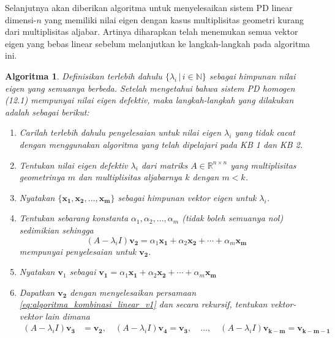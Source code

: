 \documentclass[a4paper]{article}
\theoremstyle{definisi}
\newtheorem{algoritma}{Algoritma}[section]
\numberwithin{equation}{section}
\newcommand{\R}{\mathbb{R}}
\newcommand{\N}{\mathbb{N}}
\begin{document}
  Selanjutnya akan diberikan algoritma untuk menyelesaikan sistem PD linear dimensi-$n$ yang memiliki nilai eigen dengan kasus multiplisitas geometri kurang dari multiplisitas aljabar. Artinya diharapkan telah menemukan semua vektor eigen yang bebas linear sebelum melanjutkan ke langkah-langkah pada algoritma ini.
  \begin{algoritma}\label{algoritma}
    Definisikan terlebih dahulu $\{\lambda_i\,|\,i\in\N\}$ sebagai himpunan nilai eigen yang semuanya berbeda. Setelah mengetahui bahwa sistem PD homogen (12.1) mempunyai nilai eigen \textit{defektiv}, maka langkah-langkah yang dilakukan adalah sebagai berikut:
  \begin{enumerate}[label=Langkah \arabic*: ,leftmargin=*]
    \item Carilah terlebih dahulu penyelesaian untuk nilai eigen $\lambda_i$ yang tidak cacat dengan menggunakan algoritma yang telah dipelajari pada KB 1 dan KB 2.
    \item Tentukan nilai eigen \textit{defektiv} $\lambda_i$ dari matriks $A\in\R^{n\times n}$ yang multiplisitas geometrinya $m$ dan multiplisitas aljabarnya $k$ dengan $m<k$.
    \item Nyatakan $\{\mathbf{x_1},\mathbf{x_2},\ldots,\mathbf{x_m}\}$ sebagai himpunan vektor eigen untuk $\lambda_i$.
    \item Tentukan sebarang konstanta $\alpha_1,\alpha_2,\ldots,\alpha_m$ (tidak boleh semuanya nol) sedimikian sehingga
    \begin{equation}\label{eq:algoritma_kombinasi_linear_v1}
      (A-\lambda_iI)\mathbf{v_2}=\alpha_1\mathbf{x_1}+\alpha_2\mathbf{x_2}+\cdots+\alpha_m\mathbf{x_m}
    \end{equation}
    mempunyai penyelesaian untuk $\mathbf{v_2}$.
    \item Nyatakan $\mathbf{v}_1$ sebagai $\mathbf{v_1}=\alpha_1\mathbf{x_1}+\alpha_2\mathbf{x_2}+\cdots+\alpha_m\mathbf{x_m}$ 
    \item Dapatkan $\mathbf{v_2}$ dengan menyelesaikan persamaan \eqref{eq:algoritma_kombinasi_linear_v1} dan secara rekursif, tentukan vektor-vektor lain dimana
    \begin{equation*}
      \begin{split}
        (A-\lambda_iI)\mathbf{v_3}&=\mathbf{v_2},\quad
        (A-\lambda_iI)\mathbf{v_4}=\mathbf{v_3}
        ,\quad\dots,\quad
        (A-\lambda_iI)\mathbf{v_{k-m}}=\mathbf{v_{k-m-1}}
      \end{split}
    \end{equation*}

\end{enumerate}
\end{algoritma}
\end{document}
